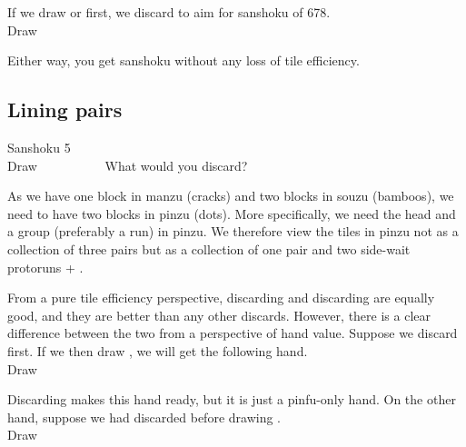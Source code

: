 If we draw {\LARGE{}} or {\LARGE{}} first, we discard {\LARGE{}} to aim for {\jap sanshoku} of 678. 
\bp
{}~\\
\hfill\footnotesize{Draw~~~~~~~~~~~~~~~}
\ep

Either way, you get {\jap sanshoku} without any loss of tile efficiency. 

\bigskip
\subsection{Lining pairs}\label{sec:san5}
\begin{itembox}[r]{{\jap Sanshoku} 5}
\bp
{}~\\
\hfill\footnotesize{Draw~~~~~~~~~~}
\ep
\vspace{-17pt}What would you discard? \vspace{-5pt}
\end{itembox}

\bigskip
As we have one block in {\jap manzu} (cracks) and two blocks in {\jap souzu} (bamboos), we need to have two blocks in {\jap pinzu} (dots). More specifically, we need the head and a group (preferably a run) in {\jap pinzu}. 
We therefore view the tiles in {\jap pinzu} not as a collection of three pairs but as a collection of one pair {\LARGE{}} and two side-wait protoruns {\LARGE{}} + {\LARGE{}}. 

\bigskip
From a pure tile efficiency perspective, discarding {\LARGE{}} and discarding {\LARGE{}} are equally good, and they are better than any other discards. However, there is a clear difference between the two from a perspective of hand value. 
Suppose we discard {\LARGE{}} first. If we then draw {\LARGE{}}, we will get the following hand.
\bp
{}~\\
\hfill\footnotesize{Draw~~~~~~~~~~~~~~~}
\ep

Discarding {\LARGE{}} makes this hand ready, but it is just a {\jap pinfu}-only hand. On the other hand, suppose we had discarded {\LARGE{}} before drawing {\LARGE{}}. 
\bp
{}~\\
\hfill\footnotesize{Draw~~~~~~~~~~~~~~~}
\ep

